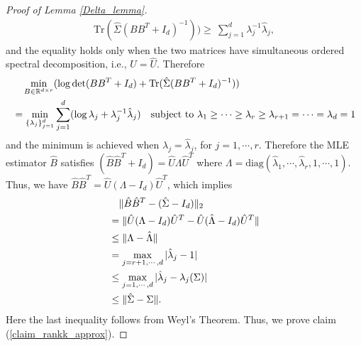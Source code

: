 \begin{proof}[Proof of Lemma \ref{Delta_lemma}]
\begin{align}
\text{Tr}(\hat{\Sigma}(BB^{T}+I_{d})^{-1})) \geq \  \sum_{j=1}^{d}   \lambda_{j}^{-1}\hat{\lambda}_{j}, 
\end{align}
and the equality holds only when the two matrices have simultaneous ordered spectral decomposition, i.e., $U=\hat{U}$. Therefore
\begin{align}
& \quad \min_{B\in \mathbb{R}^{d \times r}} (\log \det (BB^{T}+I_{d})+\text{Tr}(\hat{\Sigma}(BB^{T}+I_{d})^{-1})) \notag \\
&= \min_{\{\lambda_{j}\}_{j=1}^{d}} \sum_{j=1}^{d}( \log \lambda_{j} + \lambda_{j}^{-1}\hat{\lambda}_{j} ) \quad \text{subject to } \lambda_{1} \geq  \cdots \geq \lambda_{r} \geq \lambda_{r+1}=\cdots =\lambda_{d}=1
\end{align}
and the minimum is achieved when $\lambda_{j}=\hat{\lambda}_{j}$, for $j=1, \cdots, r$. Therefore the MLE estimator $\hat{B}$ satisfies $(\hat{B}\hat{B}^{T}+I_{d})=\hat U \Lambda \hat{U}^{T}$ 
where $\Lambda=\text{diag}(\hat{\lambda}_{1},\cdots, \hat{\lambda}_{r},1,\cdots,1)$. Thus, we have $\hat{B}\hat{B}^{T}=\hat U (\Lambda-I_{d}) \hat{U}^{T}$, which implies
\begin{align}
& \quad \|\hat{B}\hat{B}^{T} - (\hat{\Sigma}-I_{d})\|_{2} \notag \\
&= \|\hat U (\Lambda-I_{d}) \hat{U}^{T} - \hat U (\hat{\Lambda}-I_{d}) \hat{U}^{T}\|  \notag \\
& \leq \|\Lambda-\hat{\Lambda}\| \notag \\
& = \max_{j=r+1,\cdots, d} |\hat{\lambda}_{j}-1|\notag \\
& \leq \max_{j=1,\cdots, d} |\hat{\lambda}_{j}-\lambda_{j}(\Sigma)|\notag \\
&\leq \|\hat{\Sigma}-\Sigma\|.
\end{align}
Here the last inequality follows from Weyl's Theorem. Thus, we prove claim (\ref{claim_rankk_approx}).
\end{proof}